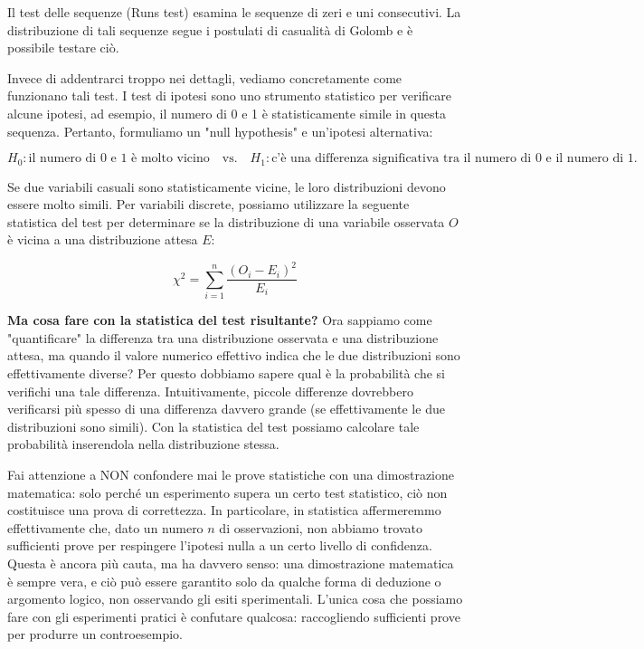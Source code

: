 \documentclass[11pt]{article}
\theoremstyle{definition} \newtheorem{definizione}{Definizione}[section] %
\begin{document}
        Il test delle sequenze (Runs test) esamina le sequenze di zeri e uni consecutivi. La distribuzione di tali sequenze segue i postulati di casualità di Golomb e è possibile testare ciò.

        Invece di addentrarci troppo nei dettagli, vediamo concretamente come funzionano tali test. I test di ipotesi sono uno strumento statistico per verificare alcune ipotesi, ad esempio, il numero di 0 e 1 è statisticamente simile in questa sequenza. Pertanto, formuliamo un "null hypothesis" e un'ipotesi alternativa:

        \[H_0 : \text{il numero di 0 e 1 è molto vicino} \quad \text{vs.} \quad H_1 : \text{c'è una differenza significativa tra il numero di 0 e il numero di 1}.\]

        Se due variabili casuali sono statisticamente vicine, le loro distribuzioni devono essere molto simili. Per variabili discrete, possiamo utilizzare la seguente statistica del test per determinare se la distribuzione di una variabile osservata \(O\) è vicina a una distribuzione attesa \(E\):

        \[\chi^2 = \sum_{i=1}^{n} \frac{(O_i - E_i)^2}{E_i}\]

        \textbf{Ma cosa fare con la statistica del test risultante?} Ora sappiamo come "quantificare" la differenza tra una distribuzione osservata e una distribuzione attesa, ma quando il valore numerico effettivo indica che le due distribuzioni sono effettivamente diverse?
        Per questo dobbiamo sapere qual è la probabilità che si verifichi una tale differenza. Intuitivamente, piccole differenze dovrebbero verificarsi più spesso di una differenza davvero grande (se effettivamente le due distribuzioni sono simili).
        Con la statistica del test possiamo calcolare tale probabilità inserendola nella distribuzione stessa.

        
        Fai attenzione a NON confondere mai le prove statistiche con una dimostrazione matematica: solo perché un esperimento supera un certo test statistico, ciò non costituisce una prova di correttezza.
        In particolare, in statistica affermeremmo effettivamente che, dato un numero \(n\) di osservazioni, non abbiamo trovato sufficienti prove per respingere l'ipotesi nulla a un certo livello di confidenza.
        Questa è ancora più cauta, ma ha davvero senso: una dimostrazione matematica è sempre vera, e ciò può essere garantito solo da qualche forma di deduzione o argomento logico, non osservando gli esiti sperimentali. L'unica cosa che possiamo fare con gli esperimenti pratici è confutare qualcosa: raccogliendo sufficienti prove per produrre un controesempio.
\end{document}
